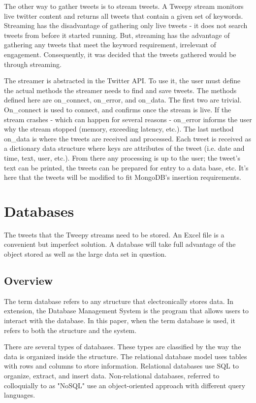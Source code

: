 \documentclass[11pt, twoside, reqno]{article}
\begin{document}
The other way to gather tweets is to stream tweets. A Tweepy stream monitors live twitter content and returns all tweets that contain a given set of keywords. Streaming has the disadvantage of gathering only live tweets - it does not search tweets from before it started running. But, streaming has the advantage of gathering any tweets that meet the keyword requirement, irrelevant of engagement. Consequently, it was decided that the tweets gathered would be through streaming. 

The streamer is abstracted in the Twitter API. To use it, the user must define the actual methods the streamer needs to find and save tweets. The methods defined here are on\_connect, on\_error, and on\_data. The first two are trivial. On\_connect is used to connect, and confirms once the stream is live. If the stream crashes - which can happen for several reasons - on\_error informs the user why the stream stopped (memory, exceeding latency, etc.). The last method on\_data is where the tweets are received and processed. Each tweet is received as a dictionary data structure where keys are attributes of the tweet (i.e. date and time, text, user, etc.). From there any processing is up to the user; the tweet's text can be printed, the tweets can be prepared for entry to a data base, etc. It's here that the tweets will be modified to fit MongoDB's insertion requirements. 

\section{Databases}
\hspace{0.1in} The tweets that the Tweepy streams need to be stored. An Excel file is a convenient but imperfect solution. A database will take full advantage of the object stored as well as the large data set in question. 
\subsection{Overview}
The term database refers to any structure that electronically stores data. In extension, the Database Management System is the program that allows users to interact with the database. In this paper, when the term database is used, it refers to both the structure and the system. 

There are several types of databases. These types are classified by the way the data is organized inside the structure. The relational database model uses tables with rows and columns to store information. Relational databases use SQL to organize, extract, and insert data. Non-relational databases, referred to colloquially to as "NoSQL" use an object-oriented approach with different query languages. 
\end{document}
